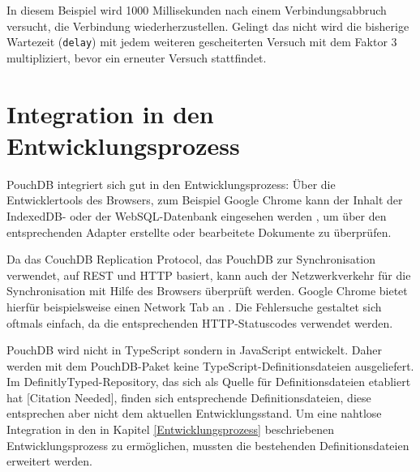 In diesem Beispiel wird 1000 Millisekunden nach einem Verbindungsabbruch versucht, die Verbindung wiederherzustellen. Gelingt das nicht wird die bisherige Wartezeit (\texttt{delay}) mit jedem weiteren gescheiterten Versuch mit dem Faktor 3 multipliziert, bevor ein erneuter Versuch stattfindet.

\section{Integration in den Entwicklungsprozess}
PouchDB integriert sich gut in den Entwicklungsprozess: Über die Entwicklertools des Browsers, zum Beispiel Google Chrome kann der Inhalt der IndexedDB- oder der WebSQL-Datenbank eingesehen werden \cite{google:chromestorage}, um über den entsprechenden Adapter erstellte oder bearbeitete Dokumente zu überprüfen.

Da das CouchDB Replication Protocol, das PouchDB zur Synchronisation verwendet, auf REST und HTTP basiert, kann auch der Netzwerkverkehr für die Synchronisation mit Hilfe des Browsers überprüft werden. Google Chrome bietet hierfür beispielsweise einen Network Tab an \cite{google:chrome}. Die Fehlersuche gestaltet sich oftmals einfach, da die entsprechenden HTTP-Statuscodes verwendet werden.

PouchDB wird nicht in TypeScript sondern in JavaScript entwickelt. Daher werden mit dem PouchDB-Paket keine TypeScript-Definitionsdateien ausgeliefert. Im DefinitlyTyped-Repository, das sich als Quelle für Definitionsdateien etabliert hat [Citation Needed], finden sich entsprechende Definitionsdateien, diese entsprechen aber nicht dem aktuellen Entwicklungsstand. Um eine nahtlose Integration in den in Kapitel \ref{Entwicklungsprozess} beschriebenen Entwicklungsprozess zu ermöglichen, mussten die bestehenden Definitionsdateien erweitert werden. 